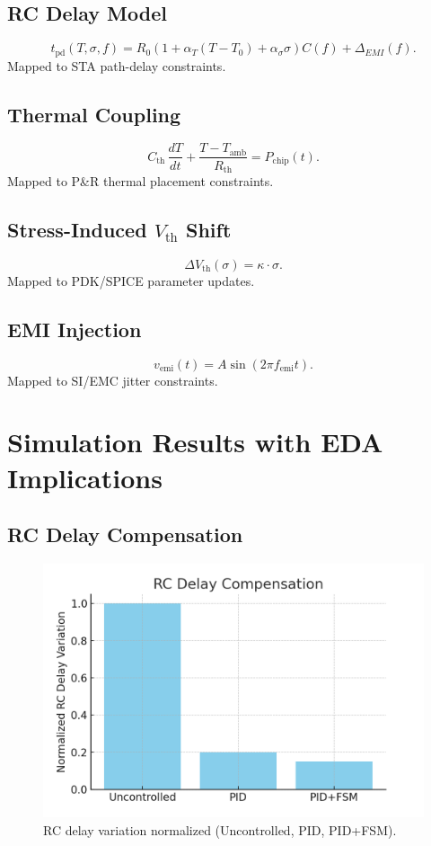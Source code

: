 \documentclass[conference]{IEEEtran}
\begin{document}
\subsection{RC Delay Model}
\begin{equation}
t_{\mathrm{pd}}(T,\sigma,f)=R_0\!\left(1+\alpha_T (T-T_0)+\alpha_\sigma \sigma\right)C(f)+\Delta_{EMI}(f).
\end{equation}
Mapped to STA path-delay constraints.

\subsection{Thermal Coupling}
\begin{equation}
C_\mathrm{th}\,\frac{dT}{dt}+\frac{T-T_\mathrm{amb}}{R_\mathrm{th}}=P_\mathrm{chip}(t).
\end{equation}
Mapped to P\&R thermal placement constraints.

\subsection{Stress-Induced $V_{\text{th}}$ Shift}
\begin{equation}
\Delta V_\mathrm{th}(\sigma)=\kappa\cdot\sigma.
\end{equation}
Mapped to PDK/SPICE parameter updates.

\subsection{EMI Injection}
\begin{equation}
v_\mathrm{emi}(t)=A\sin(2\pi f_\mathrm{emi}t).
\end{equation}
Mapped to SI/EMC jitter constraints.

\section{Simulation Results with EDA Implications}

\subsection{RC Delay Compensation}
\begin{figure}[!t]
\centering
\includegraphics[width=.95\columnwidth]{figs/sim_delay_rc.png}
\caption{RC delay variation normalized (Uncontrolled, PID, PID+FSM).}
\label{fig:rc}
\end{figure}
\end{document}
